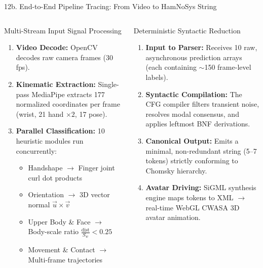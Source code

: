 \documentclass[aspectratio=169,xcolor={table,dvipsnames}]{beamer}
\begin{document}
\begin{frame}[t]{12b. End-to-End Pipeline Tracing: From Video to HamNoSys String}
\vspace{2.0mm}
\begin{columns}[T]
    \begin{block}{Multi-Stream Input Signal Processing}
        \fontsize{6.8pt}{8.6pt}\selectfont
        \begin{enumerate}\setlength{\itemsep}{0.06cm}
            \item \textbf{Video Decode:} OpenCV decodes raw camera frames (30 fps).
            \item \textbf{Kinematic Extraction:} Single-pass MediaPipe extracts 177 normalized coordinates per frame (wrist, 21 hand $\times 2$, 17 pose).
            \item \textbf{Parallel Classification:} 10 heuristic modules run concurrently:
            \begin{itemize}\setlength{\itemsep}{0.02cm}
                \item Handshape $\to$ Finger joint curl dot products
                \item Orientation $\to$ 3D vector normal $\vec{u} \times \vec{v}$
                \item Upper Body \& Face $\to$ Body-scale ratio $\frac{\text{dist}}{S_w} < 0.25$
                \item Movement \& Contact $\to$ Multi-frame trajectories
            \end{itemize}
        \end{enumerate}
    \end{block}

    \begin{block}{Deterministic Syntactic Reduction}
        \fontsize{6.8pt}{8.6pt}\selectfont
        \begin{enumerate}\setlength{\itemsep}{0.06cm}
            \item \textbf{Input to Parser:} Receives 10 raw, asynchronous prediction arrays (each containing $\sim$150 frame-level labels).
            \item \textbf{Syntactic Compilation:} The CFG compiler filters transient noise, resolves modal consensus, and applies leftmost BNF derivations.
            \item \textbf{Canonical Output:} Emits a minimal, non-redundant string (5--7 tokens) strictly conforming to Chomsky hierarchy.
            \item \textbf{Avatar Driving:} SiGML synthesis engine maps tokens to XML $\to$ real-time WebGL CWASA 3D avatar animation.
        \end{enumerate}
    \end{block}
\end{columns}
\end{frame}
\end{document}
